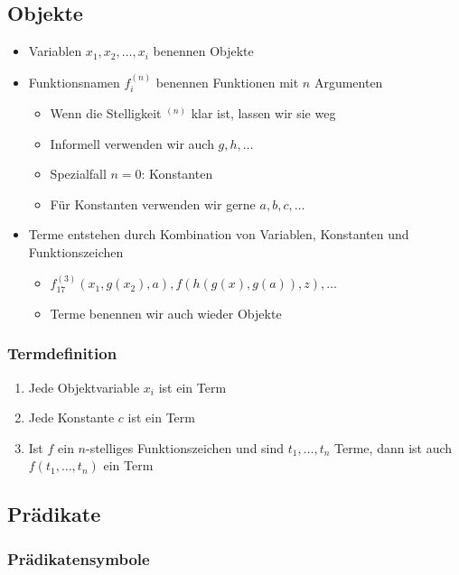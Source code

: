 \documentclass{scrartcl}
\begin{document}
\subsection{Objekte}

\begin{itemize}
	\item Variablen $x_1, x_2, \ldots, x_i$ benennen Objekte
	\item Funktionsnamen $f_i^{(n)}$ benennen Funktionen mit $n$ Argumenten
	\begin{itemize}
		\item Wenn die Stelligkeit $^{(n)}$ klar ist, lassen wir sie weg
		\item Informell verwenden wir auch $g, h, \ldots$
		\item Spezialfall $n = 0$: Konstanten
		\item Für Konstanten verwenden wir gerne $a, b, c, \ldots$
	\end{itemize}
	\item Terme entstehen durch Kombination von Variablen, Konstanten und Funktionszeichen
	\begin{itemize}
		\item $f_{17}^{(3)}(x_1, g(x_2), a), f(h(g(x), g(a)), z), \ldots$
		\item Terme benennen wir auch wieder Objekte
	\end{itemize}
\end{itemize}

\subsubsection{Termdefinition}

\begin{enumerate}
	\item Jede Objektvariable $x_i$ ist ein Term
	\item Jede Konstante $c$ ist ein Term
	\item Ist $f$ ein $n$-stelliges Funktionszeichen und sind $t_1, \ldots, t_n$ Terme, dann ist auch $f(t_1, \ldots, t_n)$ ein Term
\end{enumerate}

\subsection{Prädikate}

\subsubsection{Prädikatensymbole}
\end{document}
